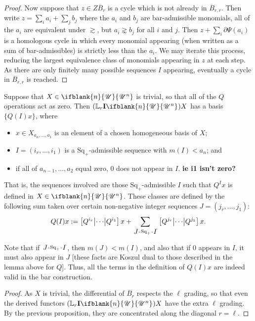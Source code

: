 \documentclass[10pt]{article}
\makeatletter
\newcommand{\nontop}[1]{\ifblank{#1}{\scrU}{\scrU^{#1}}}
\newcommand{\produces}[3]{{#1}{#3}{#2}}
\newcommand{\Ind}[2][]{\mathbf{I}{#2}_{#1}}%
\newcommand{\derived}{\mathbb{L}}
\renewcommand{\Q}{Q}
\newcommand{\SqShift}{\Sq_{+}}
\newcommand{\Sq}{\mathrm{Sq}}
\newcommand{\minDim}{m}
\renewcommand{\produces}[3]{
{
\def\labelstyle{\scriptstyle}
\xymatrix@C=2em@1{
{#1}
\ar@{-}[r]|-{{\,#3\,}}
&%
{#2}%
}}}
\makeatother
\begin{document}
\begin{KoszulComplexes2plus}
\begin{proof}
Now suppose that $z\in Z\overline{B}_r$ is a cycle which is not already in $\overline{B}_{r,r}$. Then write 
$z=\sum_i a_i + \sum_j b_j$ where the $a_i$ and $b_j$ are bar-admissible monomials, all of the $a_i$ are equivalent under $\gtrsim$, but $a_i\gnsim b_j$ for all $i$ and $j$. Then $z+\sum_i\partial\Psi(a_i)$ is a homologous cycle in which every monomial appearing (when written as a sum of bar-admissibles) is strictly less than the $a_i$. We may iterate this process, reducing the largest equivalence class of monomials appearing in $z$ at each step. As there are only finitely many possible sequences $I$ appearing, eventually a cycle in $\overline{B}_{r,r}$ is reached.
\end{proof}

\begin{prop}
Suppose that $X\in\nontop{n}$ is trivial, so that all of the $\Q$ operations act as zero. Then %
$(\derived_r\Ind{\nontop{n}})X$ has a basis $\{\Q(I)x\}$, where
\begin{itemize}
\setlength{\parindent}{.25in}
\item $x\in X_{a_n,\ldots,a_1}$ is an element of a chosen homogeneous basis of $X$;
\item $I=(i_r,\ldots,i_1)$ is a $\SqShift$-admissible sequence with $\minDim(I)<a_n$; and
\item if all of $a_{n-1},\ldots,a_2$ equal zero, $0$ does not appear in $I$. \textbf{ie i1 isn't zero?}
\end{itemize}
That is, the sequences involved are those $\SqShift$-admissible $I$ such that $Q^Ix$ is defined in $X\in\nontop{n}$.
These classes are defined by the following sum taken over certain non-negative integer sequences $J=(j_{r},\ldots,j_1)$:
\[\Q(I)x:=\left[\Q^{i_r}\middle|\cdots\middle|\Q^{i_1} \right]x+\sum_{\produces{J}{I}{\SqShift}}\left[\Q^{j_r} \middle|\cdots\middle|\Q^{j_1} \right]x.\]%
\end{prop}
\noindent Note that if $\produces{J}{I}{\SqShift}$, then $\minDim(J)<\minDim(I)$, and also that if $0$ appears in $I$, it must also appear in $J$ [these facts are Koszul dual to those described in the lemma above for $\Q$]. Thus, all the terms in the definition of $\Q(I)x$ are indeed valid in the bar construction.
\begin{proof}
As $X$ is trivial, the differential of $\overline{B}_r$ respects the $\ell$ grading, so that even the derived functors $(\derived_r\Ind{\nontop{n}})X$ have the extra $\ell$ grading. By the previous proposition, they are concentrated along the diagonal $r=\ell$.


\end{proof}
\end{KoszulComplexes2plus}
\end{document}
